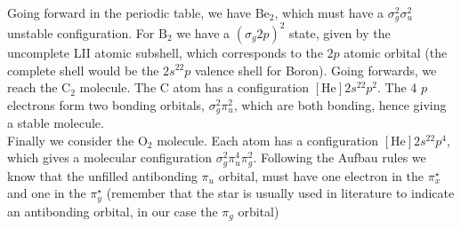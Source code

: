 \documentclass[a4paper, 11pt]{book}
\newcommand{\1}{\opr{\mathds{1}}}
\theoremstyle{plain}
\begin{document}
	Going forward in the periodic table, we have $\mathrm{Be}_2$, which must have a $\sigma_g^2\sigma_u^2$ unstable configuration. For $\mathrm{B}_2$ we have a $\left( \sigma_g 2p \right)^2$ state, given by the uncomplete LII atomic subshell, which corresponds to the $2p$ atomic orbital (the complete shell would be the $2s^22p$ valence shell for Boron). Going forwards, we reach the $\mathrm{C}_2$ molecule. The $\mathrm{C}$ atom has a configuration $[\mathrm{He}]2s^22p^2$. The 4 $p$ electrons form two bonding orbitals, $\sigma_g^2\pi_u^2$, which are both bonding, hence giving a stable molecule.\\
	Finally we consider the $\mathrm{O}_2$ molecule. Each atom has a configuration $[\mathrm{He}]2s^22p^4$, which gives a molecular configuration $\sigma_g^2\pi_u^4\pi_g^2$. Following the Aufbau rules we know that the unfilled antibonding $\pi_u$ orbital, must have one electron in the $\pi_x^{\star}$ and one in the $\pi_y^{\star}$ (remember that the star is usually used in literature to indicate an antibonding orbital, in our case the $\pi_g$ orbital)\\
\end{document}
